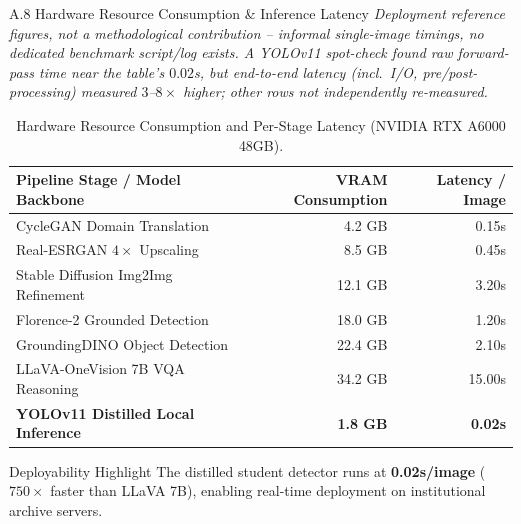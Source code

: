 \documentclass[aspectratio=169,11pt]{beamer}
\begin{document}
\begin{frame}{A.8 Hardware Resource Consumption \& Inference Latency}
\tiny
\centering
\textit{Deployment reference figures, not a methodological contribution -- informal single-image timings, no dedicated benchmark script/log exists. A YOLOv11 spot-check found raw forward-pass time near the table's $0.02$s, but end-to-end latency (incl.\ I/O, pre/post-processing) measured $3$--$8\times$ higher; other rows not independently re-measured.}
\vskip 0.2cm
\begin{table}[!htbp]
\caption{Hardware Resource Consumption and Per-Stage Latency (NVIDIA RTX A6000 48GB).}
\begin{tabular}{lrr}
\toprule
\textbf{Pipeline Stage / Model Backbone} & \textbf{VRAM Consumption} & \textbf{Latency / Image} \\
\midrule
CycleGAN Domain Translation & 4.2 GB & 0.15s \\
Real-ESRGAN $4\times$ Upscaling & 8.5 GB & 0.45s \\
Stable Diffusion Img2Img Refinement & 12.1 GB & 3.20s \\
Florence-2 Grounded Detection & 18.0 GB & 1.20s \\
GroundingDINO Object Detection & 22.4 GB & 2.10s \\
LLaVA-OneVision 7B VQA Reasoning & 34.2 GB & 15.00s \\
\textbf{YOLOv11 Distilled Local Inference} & \textbf{1.8 GB} & \textbf{0.02s} \\
\bottomrule
\end{tabular}
\end{table}

\begin{block}{Deployability Highlight}
The distilled student detector runs at \textbf{0.02s/image} ($750\times$ faster than LLaVA 7B), enabling real-time deployment on institutional archive servers.
\end{block}
\end{frame}
\end{document}
